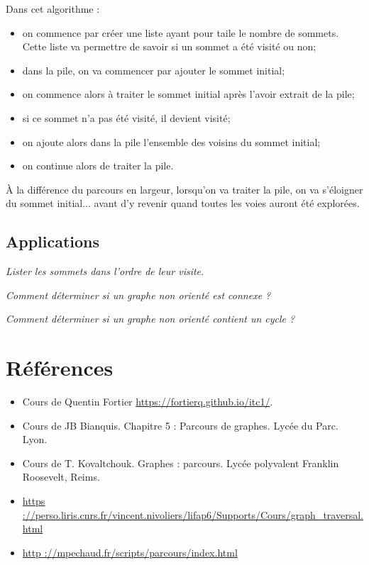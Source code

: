 Dans cet algorithme : 
\begin{itemize}
\item on commence par créer une liste ayant pour taile le nombre de sommets. Cette liste va permettre de savoir si un sommet a été visité ou non;
\item dans la pile, on va commencer par ajouter le sommet initial;
\item on commence alors à traiter le sommet initial après l'avoir extrait de la pile;
\item si ce sommet n'a pas été visité, il devient visité;
\item on ajoute alors dans la pile l'ensemble des voisins du sommet initial;
\item on continue alors de traiter la pile. 
\end{itemize}
À la différence du parcours en largeur, lorsqu'on va traiter la pile, on va s'éloigner du sommet initial... avant d'y revenir quand toutes les voies auront été explorées. 

\subsection{Applications}
\begin{exemple}
\textit{Lister les sommets dans l'ordre de leur visite.}
\end{exemple}


\begin{exemple}
\textit{Comment déterminer si un graphe non orienté est connexe ?}
\end{exemple}


\begin{exemple}
\textit{Comment déterminer si un graphe non orienté contient un cycle ?}
\end{exemple}

\section*{Références}

\begin{itemize}
\item Cours de Quentin Fortier \url{https://fortierq.github.io/itc1/}.
\item Cours de JB Bianquis. Chapitre 5 : Parcours de graphes. Lycée du Parc. Lyon.
\item Cours de T. Kovaltchouk. Graphes : parcours. Lycée polyvalent Franklin Roosevelt, Reims.
\item \url{https ://perso.liris.cnrs.fr/vincent.nivoliers/lifap6/Supports/Cours/graph_traversal.html}
\item \url{http ://mpechaud.fr/scripts/parcours/index.html}
\end{itemize}